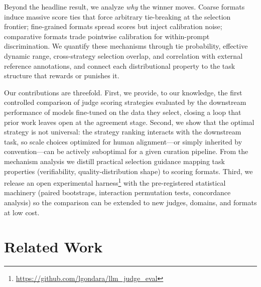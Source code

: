 Beyond the headline result, we analyze \emph{why} the winner moves.
Coarse formats induce massive score ties that force arbitrary tie-breaking
at the selection frontier; fine-grained formats spread scores but inject
calibration noise; comparative formats trade pointwise calibration for
within-prompt discrimination. We quantify these mechanisms through tie
probability, effective dynamic range, cross-strategy selection overlap,
and correlation with external reference annotations, and connect each
distributional property to the task structure that rewards or punishes it.

Our contributions are threefold. First, we provide, to our knowledge, the
first controlled comparison of judge scoring strategies evaluated by the
downstream performance of models fine-tuned on the data they select,
closing a loop that prior work leaves open at the agreement stage. Second,
we show that the optimal strategy is not universal: the strategy ranking
interacts with the downstream task, so scale choices optimized for human
alignment---or simply inherited by convention---can be actively suboptimal
for a given curation pipeline. From the mechanism analysis we distill
practical selection guidance mapping task properties (verifiability,
quality-distribution shape) to scoring formats. Third, we release an open
experimental harness\footnote{\url{https://github.com/lgondara/llm_judge_eval}}
with the pre-registered statistical machinery (paired bootstraps,
interaction permutation tests, concordance analysis) so the comparison
can be extended to new judges, domains, and formats at low cost.


\section{Related Work}

